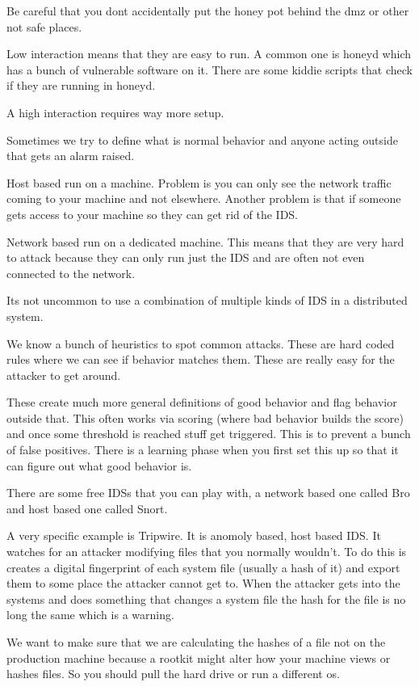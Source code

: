 \documentclass{article}
\begin{document}
Be careful that you dont accidentally put the honey pot behind the dmz or other not safe places.


Low interaction means that they are easy to run. A common one is honeyd which has a bunch of vulnerable software on it. There are some kiddie scripts that check if they are running in honeyd. 

A high interaction requires way more setup. 


Sometimes we try to define what is normal behavior and anyone acting outside that gets an alarm raised.


Host based run on a machine. Problem is you can only see the network traffic coming to your machine and not elsewhere. Another problem is that if someone gets access to your machine so they can get rid of the IDS.

Network based run on a dedicated machine. This means that they are very hard to attack because they can only run just the IDS and are often not even connected to the network.  

Its not uncommon to use a combination of multiple kinds of IDS in a distributed system.


We know a bunch of heuristics to spot common attacks. These are hard coded rules where we can see if behavior matches them. These are really easy for the attacker to get around. 


These create much more general definitions of good behavior and flag behavior outside that. This often works via scoring (where bad behavior builds the score) and once some threshold is reached stuff get triggered. This is to prevent a bunch of false positives. There is a learning phase when you first set this up so that it can figure out what good behavior is. 


There are some free IDSs that you can play with, a network based one called Bro and host based one called Snort.

A very specific example is Tripwire. It is anomoly based, host based IDS. It watches for an attacker modifying files that you normally wouldn't. To do this is creates a digital fingerprint of each system file (usually a hash of it) and export them to some place the attacker cannot get to. When the attacker gets into the systems and does something that changes a system file the hash for the file is no long the same which is a warning.

We want to make sure that we are calculating the hashes of a file not on the production machine because a rootkit might alter how your machine views or hashes files. So you should pull the hard drive or run a different os.


\end{document}
